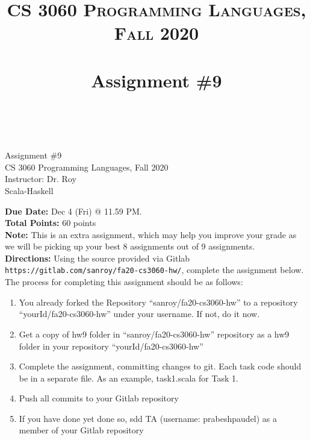 \documentclass[paper=letter, fontsize=11pt]{scrartcl} %
\title{ 
    \normalfont \normalsize 
    \textsc{CS 3060 Programming Languages, Fall 2020} \\ [25pt] %
    \horrule{0.5pt} \\[0.4cm] %
    \huge Assignment \#9  \\ %
    \horrule{2pt} \\[0.5cm] %
}
\begin{document}
    \begin{center}
         Assignment \#9\\
        \small CS 3060 Programming Languages, Fall 2020 \\
        \small Instructor: Dr. Roy \\
        \huge Scala-Haskell 
    \end{center}
    
    \textbf{Due Date:} Dec 4 (Fri) @ 11.59 PM. \\
    \textbf{Total Points:} 60 points \\
    \textbf{Note:} This is an extra assignment, which may help you improve your grade as we will be picking up your best 8 assignments out of 9 assignments.\\

    \textbf{Directions:} Using the source provided via Gitlab \@ \texttt{https://gitlab.com/sanroy/fa20-cs3060-hw/},
complete the assignment below. The process for completing this assignment should be as follows:

    \begin{enumerate}[noitemsep]
        \item You already forked the Repository ``sanroy/fa20-cs3060-hw'' to a repository ``yourId/fa20-cs3060-hw'' under your username. If not, do it now.
        \item Get a copy of hw9 folder in ``sanroy/fa20-cs3060-hw'' repository as a hw9 folder in your repository ``yourId/fa20-cs3060-hw''
        \item Complete the assignment, committing changes to git. Each task code should be in a separate file. As an example, task1.scala for Task 1.
        \item Push all commits to your Gitlab repository
        \item If you have done yet done so, sdd TA (username: prabeshpaudel) as a member of your Gitlab repository
    \end{enumerate}
\end{document}

